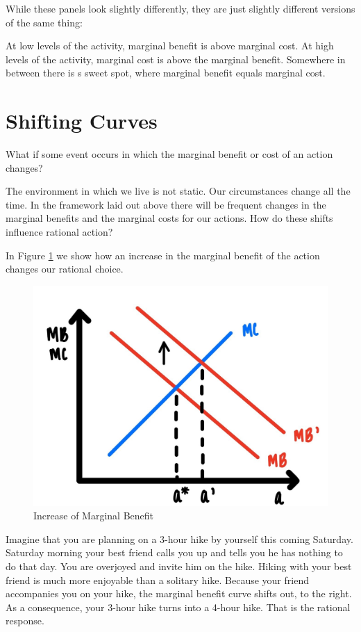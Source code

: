 \documentclass[
]{book}
\begin{document}
While these panels look slightly differently, they are just slightly different versions of the same thing:

At low levels of the activity, marginal benefit is above marginal cost. At high levels of the activity, marginal cost is above the marginal benefit. Somewhere in between there is s sweet spot, where marginal benefit equals marginal cost.

\hypertarget{shifting-curves}{%
\section{Shifting Curves}\label{shifting-curves}}

What if some event occurs in which the marginal benefit or cost of an action changes?

The environment in which we live is not static. Our circumstances change all the time. In the framework laid out above there will be frequent changes in the marginal benefits and the marginal costs for our actions. How do these shifts influence rational action?

In Figure \ref{fig:fig204} we show how an increase in the marginal benefit of the action changes our rational choice.

\begin{figure}

{\centering \includegraphics[width=0.75\linewidth]{img/ch2/fig4} 

}

\caption{Increase of Marginal Benefit}\label{fig:fig204}
\end{figure}

Imagine that you are planning on a 3-hour hike by yourself this coming Saturday. Saturday morning your best friend calls you up and tells you he has nothing to do that day. You are overjoyed and invite him on the hike. Hiking with your best friend is much more enjoyable than a solitary hike. Because your friend accompanies you on your hike, the marginal benefit curve shifts out, to the right. As a consequence, your 3-hour hike turns into a 4-hour hike. That is the rational response.
\end{document}
